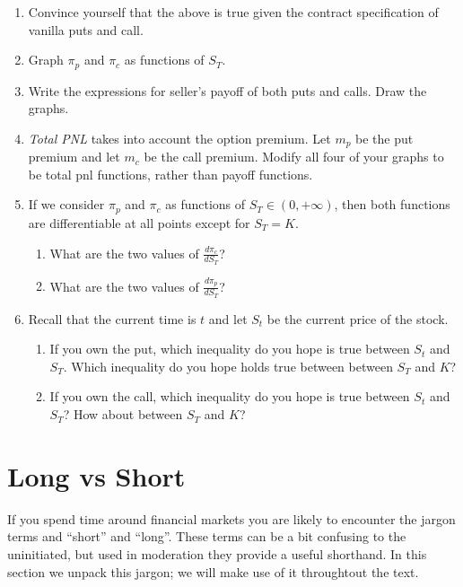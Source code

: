 \documentclass[11pt,]{krantz}
\providecommand{\tightlist}{%
  \setlength{\itemsep}{0pt}\setlength{\parskip}{0pt}}
\begin{document}
\begin{enumerate}
\def\labelenumi{\arabic{enumi}.}
\item
  Convince yourself that the above is true given the contract specification of vanilla puts and call.
\item
  Graph \(\pi_{p}\) and \(\pi_{c}\) as functions of \(S_{T}\).
\item
  Write the expressions for seller's payoff of both puts and calls. Draw the graphs.
\item
  \emph{Total PNL} takes into account the option premium. Let \(m_{p}\) be the put premium and let \(m_{c}\) be the call premium. Modify all four of your graphs to be total pnl functions, rather than payoff functions.
\item
  If we consider \(\pi_{p}\) and \(\pi_{c}\) as functions of \(S_T \in (0, +\infty)\), then both functions are differentiable at all points except for \(S_T = K\).

  \begin{enumerate}
  \def\labelenumii{\alph{enumii}.}
  \tightlist
  \item
    What are the two values of \(\frac{d\pi_{c}}{dS_{T}}\)?
  \item
    What are the two values of \(\frac{d\pi_{p}}{dS_{T}}\)?
  \end{enumerate}
\item
  Recall that the current time is \(t\) and let \(S_{t}\) be the current price of the stock.

  \begin{enumerate}
  \def\labelenumii{\alph{enumii}.}
  \tightlist
  \item
    If you own the put, which inequality do you hope is true between \(S_{t}\) and \(S_{T}\). Which inequality do you hope holds true between between \(S_{T}\) and \(K\)?
  \item
    If you own the call, which inequality do you hope is true between \(S_{t}\) and \(S_{T}\)? How about between \(S_{T}\) and \(K\)?
  \end{enumerate}
\end{enumerate}

\section{Long vs Short}\label{long-vs-short}

If you spend time around financial markets you are likely to encounter the jargon terms and ``short'' and ``long''. These terms can be a bit confusing to the uninitiated, but used in moderation they provide a useful shorthand. In this section we unpack this jargon; we will make use of it throughtout the text.
\end{document}
